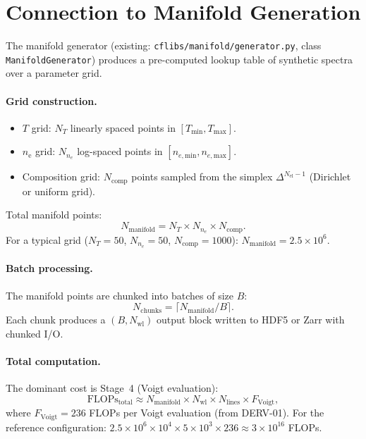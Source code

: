 \documentclass[11pt]{article}
\newcommand{\ne}{n_\mathrm{e}}
\begin{document}
\section{Connection to Manifold Generation}
\label{sec:manifold}

The manifold generator (existing: \texttt{cflibs/manifold/generator.py},
class \texttt{ManifoldGenerator}) produces a pre-computed lookup table of
synthetic spectra over a parameter grid.

\paragraph{Grid construction.}
\begin{itemize}
  \item $T$ grid: $N_T$ linearly spaced points in $[T_\mathrm{min}, T_\mathrm{max}]$.
  \item $\ne$ grid: $N_{n_e}$ log-spaced points in $[n_{e,\mathrm{min}}, n_{e,\mathrm{max}}]$.
  \item Composition grid: $N_\mathrm{comp}$ points sampled from the simplex
    $\Delta^{N_\mathrm{el}-1}$ (Dirichlet or uniform grid).
\end{itemize}
Total manifold points:
\begin{equation}
  \label{eq:manifold-points}
  N_\mathrm{manifold} = N_T \times N_{n_e} \times N_\mathrm{comp}.
\end{equation}
For a typical grid ($N_T = 50$, $N_{n_e} = 50$, $N_\mathrm{comp} = 1000$):
$N_\mathrm{manifold} = 2.5\times10^6$.

\paragraph{Batch processing.}
The manifold points are chunked into batches of size $B$:
\begin{equation}
  \label{eq:n-chunks}
  N_\mathrm{chunks} = \lceil N_\mathrm{manifold} / B \rceil.
\end{equation}
Each chunk produces a $(B, N_\mathrm{wl})$ output block written to
HDF5 or Zarr with chunked I/O.

\paragraph{Total computation.}
The dominant cost is Stage~4 (Voigt evaluation):
\begin{equation}
  \label{eq:total-flops}
  \mathrm{FLOPs}_\mathrm{total} \approx N_\mathrm{manifold} \times N_\mathrm{wl}
    \times N_\mathrm{lines} \times F_\mathrm{Voigt},
\end{equation}
where $F_\mathrm{Voigt} = 236$ FLOPs per Voigt evaluation (from DERV-01).
For the reference configuration:
$2.5\times10^6 \times 10^4 \times 5\times10^3 \times 236 \approx 3 \times 10^{16}$ FLOPs.
\end{document}
